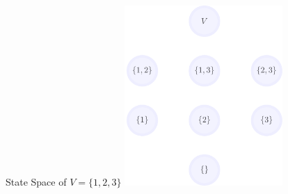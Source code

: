 \documentclass[mathserif]{beamer}
\begin{document}
\begin{frame}{State Space of $V = \{1, 2, 3\}$}
\vspace{1em}
\centering
\includegraphics[height=2.7in]{figures/lattice_nodes_only.pdf}
\end{frame}
\end{document}
